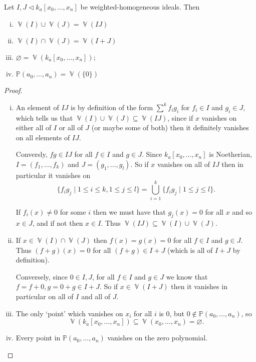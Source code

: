 \documentclass[10pt,notitlepage]{article}
\numberwithin{equation}{subsection}
\DeclareMathOperator{\van}{\mathbb{V}}
\newcommand{\pee}{\mathbb{P}}
\newcommand{\kazn}{k_a[x_0,\ldots,x_n]}
\newcommand{\pazn}{\pee(a_0,\ldots,a_n)}
\newcommand{\zi}{\{0\}}
\begin{document}
    \begin{lemma}\label{lem:topology-well-defined}
        Let $I,J\triangleleft\kazn$ be weighted-homogeneous ideals.
        Then
        \begin{enumerate}[(i)]
            \item $\van(I)\cup\van(J)=\van(IJ)$
            \item $\van(I)\cap\van(J)=\van(I+J)$
            \item $\varnothing=\van(\kazn)$;
            \item $\pazn=\van(\zi)$\qedhere
        \end{enumerate}
    \end{lemma}
    
    \begin{proof}
        \begin{enumerate}[(i)]
            \item An element of $IJ$ is by definition of the form $\sum^k f_ig_i$ for $f_i\in I$ and $g_i\in J$, which tells us that $\van(I)\cup\van(J)\subseteq\van(IJ)$, since if $x$ vanishes on either all of $I$ or all of $J$ (or maybe some of both) then it definitely vanishes on all elements of $IJ$.

            Conversly, $fg\in IJ$ for all $f\in I$ and $g\in J$.
            Since $\kazn$ is Noetherian, $I=(f_1,\ldots,f_k)$ and $J=(g_1,\ldots,g_l)$.
            So if $x$ vanishes on all of $IJ$ then in particular it vanishes on
            \[\{f_ig_j\mid 1\leqslant i\leqslant k, 1\leqslant j\leqslant l\} = \bigcup_{i=1}^k\{f_ig_j\mid 1\leqslant j\leqslant l\}.\]

            If $f_i(x)\neq0$ for some $i$ then we must have that $g_j(x)=0$ for all $x$ and so $x\in J$, and if not then $x\in I$.
            Thus $\van(IJ)\subseteq\van(I)\cup\van(J)$.
            \item If $x\in\van(I)\cap\van(J)$ then $f(x)=g(x)=0$ for all $f\in I$ and $g\in J$.
            Thus $(f+g)(x)=0$ for all $(f+g)\in I+J$ (which is all of $I+J$ by definition).

            Conversely, since $0\in I,J$, for all $f\in I$ and $g\in J$ we know that $f=f+0,g=0+g\in I+J$.
            So if $x\in\van(I+J)$ then it vanishes in particular on all of $I$ and all of $J$.
            \item The only `point' which vanishes on $x_i$ for all $i$ is $0$, but $0\not\in\pazn$, so
            \[\van(\kazn)\subseteq\van(x_0,\ldots,x_n)=\varnothing.\]
            \item Every point in $\pazn$ vanishes on the zero polynomial.\qedhere
        \end{enumerate}
    \end{proof}
\end{document}
